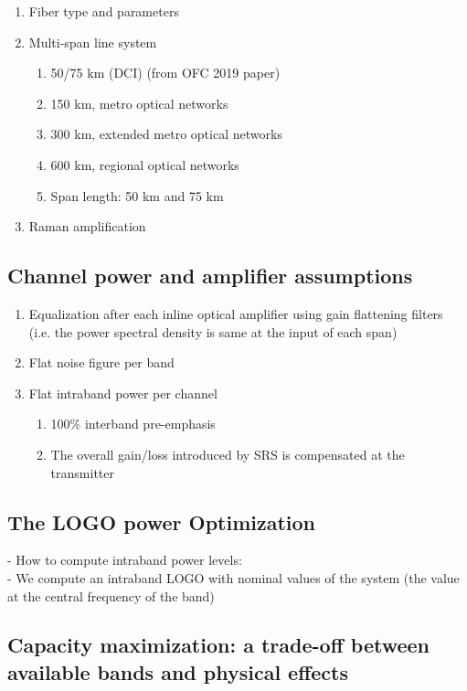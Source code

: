 \documentclass[journal]{IEEEtran}
\begin{document}
\begin{enumerate}
    \item Fiber type and parameters
    \item Multi-span line system
        \begin{enumerate}
            \item 50/75 km (DCI) (from OFC 2019 paper)
            \item 150 km, metro optical networks
            \item 300 km, extended metro optical networks
            \item 600 km, regional optical networks
            \item Span length: 50 km and 75 km
        \end{enumerate}
    \item Raman amplification
\end{enumerate}
\subsection{Channel power and amplifier assumptions}
\begin{enumerate}
    \item Equalization after each inline optical amplifier using gain flattening filters (i.e. the power spectral density is same at the input of each span)
    \item Flat noise figure per band
    \item Flat intraband power per channel
    \begin{enumerate}
        \item 100\% interband pre-emphasis
        \item The overall gain/loss introduced by SRS is compensated at the transmitter 
    \end{enumerate}
\end{enumerate}
\subsection{The LOGO power Optimization}
- How to compute intraband power levels:\\
    - We compute an intraband LOGO with nominal values of the system (the value at the central frequency of the band)
\subsection{Capacity maximization: a trade-off between available bands and physical effects}\label{Sec:capacity_maximization}
\end{document}
